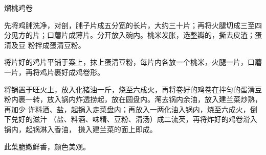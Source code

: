 %
%
%
%
%
%
%
\begin{recipe}{熘桃鸡卷}

\ingredients


\preparation

\step 先将鸡脯洗净，对剖，脯子片成五分宽的长片，大约三十片；再将火腿切成三至四
分见方的片；口蘑片成薄片。分开放入碗内。桃米发胀，选整瓣的，撕去皮渣；蛋清及豆
粉拌成蛋清豆粉。

\step 将片好的鸡片平铺于案上，抹上蛋清豆粉，每片内各放一个桃米，火腿一片，口蘑
一片，再将鸡片裹好成鸡卷形。

\step 将锅置于旺火上，放入化猪油一斤，烧至六成火，再将卷好的鸡卷在拌匀的蛋清豆
粉内裹一转，放入锅内炸透捞起，放在圆盘内。滗去锅内余油，放入建兰菜炒熟，再加少
许料酒、盐，起锅入走菜盘内；再放入一两化油入锅内，烧至六成火，倒下兑好的滋汁
（盐、料酒、味精、豆粉、清汤）成二流芡，再将炸好的鸡卷滑入锅内，起锅淋入香油，
搛入建兰菜的面上即成。

\features

此菜脆嫩鲜香，颜色美观。

\end{recipe}

